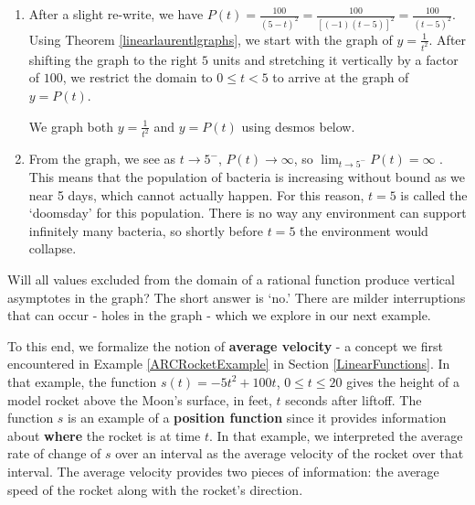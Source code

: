 \documentclass{ximera}
\begin{document}
\begin{example}
\begin{explanation}
\begin{enumerate}
\item After a slight re-write, we have $P(t) = \frac{100}{(5-t)^2} = \frac{100}{[(-1)(t-5)]^2} = \frac{100}{(t-5)^2}$.  Using Theorem \ref{linearlaurentlgraphs}, we start with the graph of $y = \frac{1}{t^2}$.  After shifting the graph to the right $5$ units and stretching it vertically by a factor of $100$, we restrict the domain to  $0 \leq t < 5$ to arrive at the graph of $y = P(t)$.  

We graph both $y = \frac{1}{t^2}$ and $y = P(t)$ using desmos below.

\begin{center}
\end{center}


\item From the graph, we see as  $t \rightarrow 5^{-}$, $P(t) \rightarrow \infty$, so $\lim_{t \rightarrow 5^{-}} P(t) = \infty$ . This means that the population of bacteria is increasing without bound as we near 5 days, which cannot actually happen.  For this reason, $t=5$ is called the `doomsday' for this population. There is no way any environment can support infinitely many bacteria, so shortly before $t = 5$ the environment would collapse. 


\end{enumerate}
\end{explanation}
\end{example}

Will all  values excluded from the domain of a rational function produce vertical asymptotes in the graph?  The short answer is `no.'  There are milder interruptions that can occur - holes in the graph - which we explore in our next example.  

To this end, we formalize the notion of \textbf{average velocity} - a concept we first encountered in  Example \ref{ARCRocketExample} in Section \ref{LinearFunctions}. In that example, the function $s(t) = -5t^2+100t$, $0 \leq t \leq 20$ gives the height of a model rocket above the Moon's surface, in feet,  $t$ seconds after liftoff.  The function $s$ is an example of a \textbf{position function} since it provides information about \textbf{where} the rocket is at time $t$.   In that example, we interpreted the average rate of change of $s$ over an interval as the average velocity of the rocket over that interval.  The average velocity provides two pieces of information:  the average speed of the rocket along with the rocket's direction.  
\end{document}
